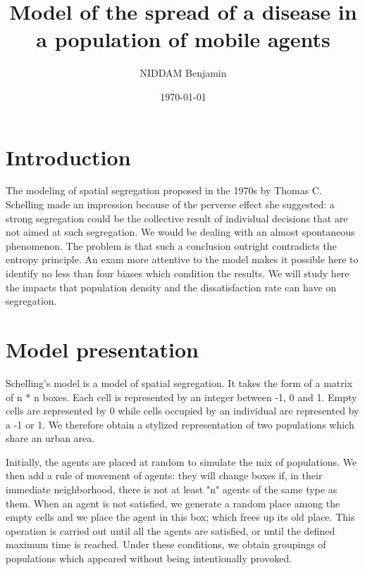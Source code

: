\documentclass[a4paper, 12pt]{report}
\title{Model of the spread of a disease in a population of mobile agents}
\author{NIDDAM Benjamin}
\date{\today}
\begin{document}
\begin{titlepage}
	\maketitle
\end{titlepage}

\newpage

\tableofcontents

\newpage
\section{Introduction}
The modeling of spatial segregation proposed in the 1970s by Thomas
C. Schelling made an impression because of the perverse effect she suggested: a strong
segregation could be the collective result of individual decisions that are not aimed at
such segregation. We would be dealing with an almost spontaneous phenomenon. The problem is
that such a conclusion outright contradicts the entropy principle. An exam
more attentive to the model makes it possible here to identify no less than four biases which condition the
results. We will study here the impacts that population density and the dissatisfaction rate can have on segregation.

\section{Model presentation}

Schelling's model is a model of spatial segregation. It takes the form of a matrix of n * n boxes.
Each cell is represented by an integer between -1, 0 and 1. Empty cells are represented by 0 while cells
occupied by an individual are represented by a -1 or 1. We therefore obtain a stylized representation of two populations which
share an urban area.

Initially, the agents are placed at random to simulate the mix of populations. We then add a rule of
movement of agents: they will change boxes if, in their immediate neighborhood, there is not at least "n"
agents of the same type as them. When an agent is not satisfied, we generate a random place among the empty cells and we
place the agent in this box; which frees up its old place. This operation is carried out until all the agents
are satisfied, or until the defined maximum time is reached. Under these conditions, we obtain groupings of
populations which appeared without being intentionally provoked.

\end{document}
